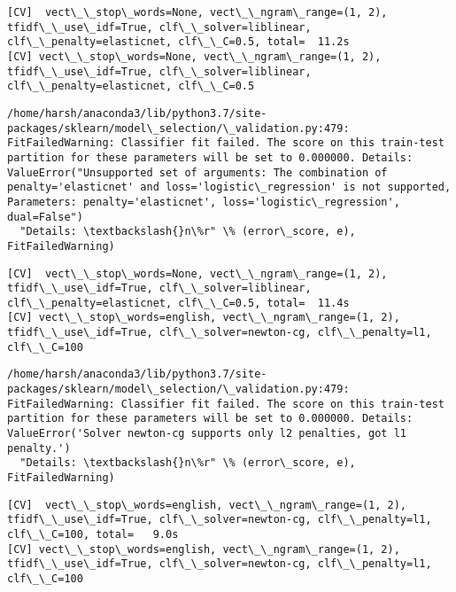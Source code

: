 \documentclass[11pt]{article}
\begin{document}
    \begin{Verbatim}[commandchars=\\\{\}]
[CV]  vect\_\_stop\_words=None, vect\_\_ngram\_range=(1, 2), tfidf\_\_use\_idf=True, clf\_\_solver=liblinear, clf\_\_penalty=elasticnet, clf\_\_C=0.5, total=  11.2s
[CV] vect\_\_stop\_words=None, vect\_\_ngram\_range=(1, 2), tfidf\_\_use\_idf=True, clf\_\_solver=liblinear, clf\_\_penalty=elasticnet, clf\_\_C=0.5 

    \end{Verbatim}

    \begin{Verbatim}[commandchars=\\\{\}]
/home/harsh/anaconda3/lib/python3.7/site-packages/sklearn/model\_selection/\_validation.py:479: FitFailedWarning: Classifier fit failed. The score on this train-test partition for these parameters will be set to 0.000000. Details: 
ValueError("Unsupported set of arguments: The combination of penalty='elasticnet' and loss='logistic\_regression' is not supported, Parameters: penalty='elasticnet', loss='logistic\_regression', dual=False")
  "Details: \textbackslash{}n\%r" \% (error\_score, e), FitFailedWarning)

    \end{Verbatim}

    \begin{Verbatim}[commandchars=\\\{\}]
[CV]  vect\_\_stop\_words=None, vect\_\_ngram\_range=(1, 2), tfidf\_\_use\_idf=True, clf\_\_solver=liblinear, clf\_\_penalty=elasticnet, clf\_\_C=0.5, total=  11.4s
[CV] vect\_\_stop\_words=english, vect\_\_ngram\_range=(1, 2), tfidf\_\_use\_idf=True, clf\_\_solver=newton-cg, clf\_\_penalty=l1, clf\_\_C=100 

    \end{Verbatim}

    \begin{Verbatim}[commandchars=\\\{\}]
/home/harsh/anaconda3/lib/python3.7/site-packages/sklearn/model\_selection/\_validation.py:479: FitFailedWarning: Classifier fit failed. The score on this train-test partition for these parameters will be set to 0.000000. Details: 
ValueError('Solver newton-cg supports only l2 penalties, got l1 penalty.')
  "Details: \textbackslash{}n\%r" \% (error\_score, e), FitFailedWarning)

    \end{Verbatim}

    \begin{Verbatim}[commandchars=\\\{\}]
[CV]  vect\_\_stop\_words=english, vect\_\_ngram\_range=(1, 2), tfidf\_\_use\_idf=True, clf\_\_solver=newton-cg, clf\_\_penalty=l1, clf\_\_C=100, total=   9.0s
[CV] vect\_\_stop\_words=english, vect\_\_ngram\_range=(1, 2), tfidf\_\_use\_idf=True, clf\_\_solver=newton-cg, clf\_\_penalty=l1, clf\_\_C=100 

    \end{Verbatim}
\end{document}
